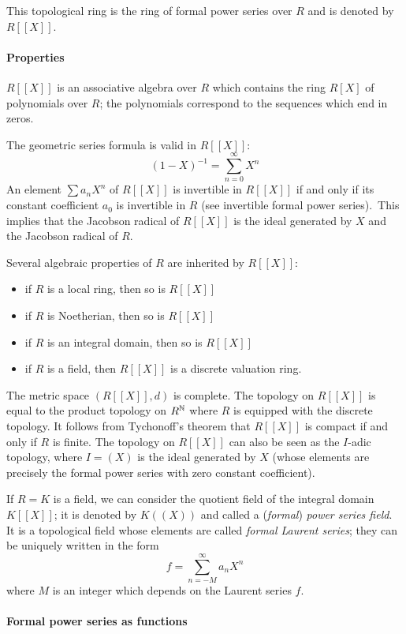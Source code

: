 \documentclass[12pt]{article}
\begin{document}
This topological ring is the ring of formal power series over $R$ and
is denoted by $R[[X]]$.

\paragraph{Properties}

$R[[X]]$ is an associative algebra over $R$ which contains the ring
$R[X]$ of polynomials over $R$; the polynomials correspond to the
sequences which end in zeros.

The geometric series formula is valid in $R[[X]]$:
$$(1-X)^{-1}=\sum_{n=0}^\infty X^n$$
An element $\sum a_n X^n$ of $R[[X]]$ is invertible in $R[[X]]$ if and only if its
constant coefficient $a_0$ is invertible in $R$ (see invertible formal power series).\, This implies that the
Jacobson radical of $R[[X]]$ is the ideal generated by $X$ and the
Jacobson radical of $R$.

Several algebraic properties of $R$ are inherited by $R[[X]]$:
\begin{itemize}
\item if $R$ is a local ring, then so is $R[[X]]$
\item if $R$ is Noetherian, then so is $R[[X]]$
\item if $R$ is an integral domain, then so is $R[[X]]$
\item if $R$ is a field, then $R[[X]]$ is a discrete valuation ring.
\end{itemize}

The metric space $(R[[X]],d)$ is complete. The topology on $R[[X]]$ is
equal to the product topology on $R^\Bbb{N}$ where $R$ is equipped
with the discrete topology. It follows from  Tychonoff's theorem that
$R[[X]]$ is compact if and only if $R$ is finite. The topology on
$R[[X]]$ can also be seen as the $I$-adic topology, where $I=(X)$ is
the ideal generated by $X$ (whose elements are precisely the formal
power series with zero constant coefficient).

If $R=K$ is a field, we can consider the quotient field of the
integral domain $K[[X]]$; it is denoted by $K((X))$ and called a (\emph{formal}) \emph{power series field}. It is a
topological field whose elements are called \emph{formal Laurent
series}; they can be uniquely written in the form
$$f = \sum_{n=-M}^\infty a_n X^n$$
where $M$ is an integer which depends on the Laurent series $f$. 

\paragraph{Formal power series as functions}
\end{document}
